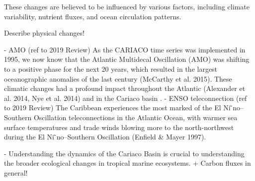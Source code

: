 










    







    
    These changes are believed to be influenced by various factors, including climate variability, nutrient fluxes, and ocean circulation patterns.

    Describe physical changes!

    - AMO (ref to 2019 Review)
    As the CARIACO time series was implemented in 1995, we now know that the Atlantic Multidecal Oscillation (AMO) was shifting to a positive phase for the next 20 years, which resulted in the largest oceanographic anomalies of the last century (McCarthy et al. 2015). These climatic changes had a profound impact throughout the Atlantic (Alexander et al. 2014, Nye et al. 2014) and in the Cariaco basin \cite{taylor_ecosystem_2012,pinckney_phytoplankton_2015}.
    - ENSO teleconnection (ref to 2019 Review)
    The Caribbean experiences the most marked of the El Ni  ̃no–Southern Oscillation teleconnections in the Atlantic Ocean, with warmer sea surface temperatures and trade winds blowing more to the north-northwest during the El Ni  ̃no–Southern Oscillation (Enfield & Mayer 1997).

     - Understanding the dynamics of the Cariaco Basin is crucial to understanding the broader ecological changes in tropical marine ecosystems. + Carbon fluxes in general!



    






